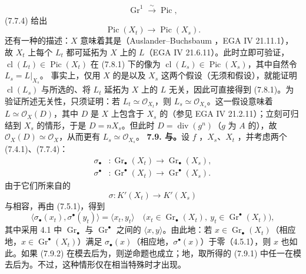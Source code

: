 \[\operatorname{Gr}^1\xrightarrow{\sim}\operatorname{Pic},\]
 (7.7.4) 给出
\[\operatorname{Pic}(X_t)\longrightarrow\operatorname{Pic}(X_s).\tag{7.8.1}\]
还有一种的描述：$X$ 意味着其是（Auslander--Buchsbaum ，EGA IV 21.11.1），故 $X_t$ 上每个 $L_t$ 都可延拓为 $X$ 上的 $L$（EGA IV 21.6.11）。此时立即可验证，$\operatorname{cl}(L_t)\in\operatorname{Pic}(X_t)$ 在 (7.8.1) 下的像为 $\operatorname{cl}(L_s)\in\operatorname{Pic}(X_s)$，其中自然令 $L_s=L|_{X_s}$。
事实上，仅用 $X$ 的是以及 $X_s$ 这两个假设（无须和假设），就能证明 $\operatorname{cl}(L_s)$ 与所选的、将 $L_t$ 延拓为 $X$ 上的 $L$ 无关，因此可直接得到 (7.8.1)。为验证所述无关性，只须证明：若 $L_t\simeq\mathcal O_{X_t}$，则 $L_s\simeq\mathcal O_{X_s}$。这一假设意味着 $L\simeq\mathcal O_X(D)$，其中 $D$ 是 $X$ 上包含于 $X_s$ 的（参见 EGA IV 21.2.11）；立刻可归结到 $X_s$ 的情形，于是 $D=nX_s$。但此时 $D=\operatorname{div}(g^n)$（$g$ 为 $A$ 的），故 $\mathcal O_X(D)\simeq\mathcal O_X$，从而更有 $L_s\simeq\mathcal O_{X_s}$。
\textbf{7.9. 与。}设 $f$ ，$X_s$、$X_t$ ，并考虑两个 (7.4.1)、(7.7.4)：
\[\begin{aligned}\sigma_\bullet&:\operatorname{Gr}_\bullet(X_t)\longrightarrow\operatorname{Gr}_\bullet(X_s),\\\sigma^\bullet&:\operatorname{Gr}^{\bullet}(X_t)\longrightarrow\operatorname{Gr}^{\bullet}(X_s).\end{aligned}\tag{7.9.1}\]
由于它们所来自的
\[\sigma:K'(X_t)\longrightarrow K'(X_s)\tag{7.9.2}\]
与相容，再由 (7.5.1)，得到
\[\langle\sigma_\bullet(x_t),\sigma^\bullet(y_t)\rangle=\langle x_t,y_t\rangle\quad\bigl(x_t\in\operatorname{Gr}_\bullet(X_t),\ y_t\in\operatorname{Gr}^{\bullet}(X_t)\bigr),\tag{7.9.3}\]
其中采用 4.1 中 $\operatorname{Gr}_\bullet$ 与 $\operatorname{Gr}^{\bullet}$ 之间的 $\langle x,y\rangle$。由此地：若 $x\in\operatorname{Gr}_\bullet(X_t)$（相应地，$x\in\operatorname{Gr}^{\bullet}(X_t)$）满足 $\sigma_\bullet(x)$（相应地，$\sigma^\bullet(x)$）于零（4.5.1），则 $x$ 也如此。如果 (7.9.2) 在模去后为，则逆命题也成立；地，取所得的 (7.9.1) 中任一在模去后为。不过，这种情形仅在相当特殊时才出现。
